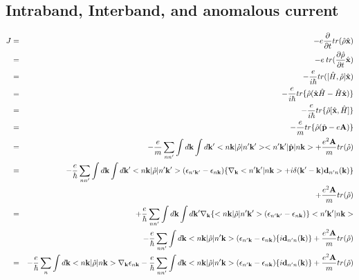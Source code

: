 \documentclass[aps,prb,preprint]{revtex4-1}
\begin{document}
\begin{appendix}
\section{Intraband, Interband, and anomalous current}
\begin{eqnarray}
J &=&  -e\frac{\partial}{\partial t} tr(\hat{\rho}\hat{\bf x}) \nonumber \\
&=&  -e\: tr(\frac{\partial \hat{\rho} }{\partial t}\hat{\bf x}) \nonumber \\
&=&  -\frac{e}{i \hbar} tr([\hat{H}, \hat{\rho}] \hat{\bf x}) \nonumber \\
&=&  -\frac{e}{i \hbar} tr\{\hat{\rho}(\hat{\bf x}\hat{H}-\hat{H}\hat{\bf x})\} \nonumber \\
&=&  -\frac{e}{i \hbar} tr\{\hat{\rho}[\hat{\bf x},\hat{H}]\} \nonumber \\
&=&  -\frac{e}{m} tr\{\hat{\rho}(\hat{\bf p}-e{\bf A})\} \nonumber \\
&=&   - \frac{e}{m} \sum_{nn'}\int d{\bf k} \int d{\bf k'} <n{\bf k}|\hat{\rho}|n'{\bf k'}><n'{\bf k'}|\hat{\bf p}|n{\bf k}> +\frac{e^2{\bf A}}{m}tr(\hat{\rho}) \nonumber \\
&=&   -\frac{e}{\hbar} \sum_{nn'} \int d{\bf k}\int d{\bf k'} <n{\bf k}|\hat{\rho}|n'{\bf k'}> (\epsilon_{n'{\bf k'}}-\epsilon_{n{\bf k}})\{\nabla_{\bf k} <n'{\bf k'}|n{\bf k}> + i \delta({\bf k'-k}) {\bf d}_{n'n}({\bf k})\}  \nonumber \\
&& + \frac{e^2{\bf A}}{m}tr(\hat{\rho}) \nonumber \\
&=&   +\frac{e}{\hbar} \sum_{nn'} \int d{\bf k}\int d{\bf k'} \nabla_{\bf k}\{<n{\bf k}|\hat{\rho}|n'{\bf k'}> (\epsilon_{n'{\bf k'}}-\epsilon_{n{\bf k}})\} <n'{\bf k'}|n{\bf k}>   \nonumber \\
&&   -\frac{e}{\hbar} \sum_{nn'} \int d{\bf k} <n{\bf k}|\hat{\rho}|n'{\bf k}> (\epsilon_{n'{\bf k}}-\epsilon_{n{\bf k}}) \{i {\bf d}_{n'n}({\bf k})\}  + \frac{e^2{\bf A}}{m}tr(\hat{\rho}) \nonumber \\
&=&  -\frac{e}{\hbar} \sum_{n} \int d{\bf k} <n{\bf k}|\hat{\rho}|n{\bf k}> \nabla_{\bf k} \epsilon_{n{\bf k}}  -\frac{e}{\hbar} \sum_{nn'} \int d{\bf k} <n{\bf k}|\hat{\rho}|n'{\bf k}> (\epsilon_{n'{\bf k}}-\epsilon_{n{\bf k}}) \{i {\bf d}_{n'n}({\bf k})\}  + \frac{e^2{\bf A}}{m}tr(\hat{\rho}) \nonumber \\
\end{eqnarray} 


\end{appendix}
\end{document}
